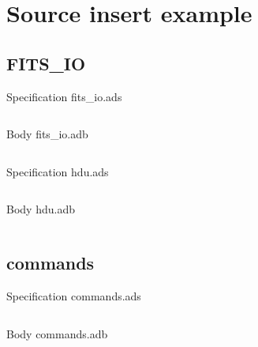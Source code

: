 \documentclass[a4paper,10pt]{article}
\begin{document}
\section{Source insert example}

\subsection{FITS\_IO}

Specification fits\_io.ads
\inputminted{ada}{../fits_io.ads}

Body fits\_io.adb
\inputminted{ada}{../fits_io.adb}

Specification hdu.ads
\inputminted{ada}{../hdu.ads}

Body hdu.adb
\inputminted{ada}{../hdu.adb}


\subsection{commands}

Specification commands.ads
\inputminted{ada}{../commands.ads}

Body commands.adb
\inputminted{ada}{../commands.adb}


\end{document}
